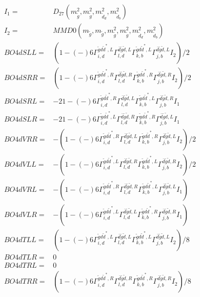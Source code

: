 \documentclass[A4,landscape]{article}
\begin{document}
\begin{align} 
I_1 = & D_{27}(m^2_{\tilde{g}}, m^2_{\tilde{g}}, m^2_{\tilde{d}_{{d}}}, m^2_{\tilde{d}_{{b}}}) \\ 
I_2 = & MMD0(m_{\tilde{g}}, m_{\tilde{g}}, m^2_{\tilde{g}}, m^2_{\tilde{g}}, m^2_{\tilde{d}_{{d}}}, m^2_{\tilde{d}_{{b}}}) \\ 
  BO4dSLL= & (  1
-(-)
  6 \Gamma^{\tilde{g} d \tilde{d}^*,L}_{i, d} \Gamma^{\bar{d}\tilde{g} \tilde{d} ,L}_{l, d} \Gamma^{\tilde{g} d \tilde{d}^*,L}_{k, b} \Gamma^{\bar{d}\tilde{g} \tilde{d} ,L}_{j, b} I_2)/2 \\ 
  BO4dSRR= & (  1
-(-)
  6 \Gamma^{\tilde{g} d \tilde{d}^*,R}_{i, d} \Gamma^{\bar{d}\tilde{g} \tilde{d} ,R}_{l, d} \Gamma^{\tilde{g} d \tilde{d}^*,R}_{k, b} \Gamma^{\bar{d}\tilde{g} \tilde{d} ,R}_{j, b} I_2)/2 \\ 
  BO4dSRL= & -2   1
-(-)
  6 \Gamma^{\tilde{g} d \tilde{d}^*,R}_{i, d} \Gamma^{\bar{d}\tilde{g} \tilde{d} ,L}_{l, d} \Gamma^{\tilde{g} d \tilde{d}^*,L}_{k, b} \Gamma^{\bar{d}\tilde{g} \tilde{d} ,R}_{j, b} I_1 \\ 
  BO4dSLR= & -2   1
-(-)
  6 \Gamma^{\tilde{g} d \tilde{d}^*,L}_{i, d} \Gamma^{\bar{d}\tilde{g} \tilde{d} ,R}_{l, d} \Gamma^{\tilde{g} d \tilde{d}^*,R}_{k, b} \Gamma^{\bar{d}\tilde{g} \tilde{d} ,L}_{j, b} I_1 \\ 
  BO4dVRR= & -(  1
-(-)
  6 \Gamma^{\tilde{g} d \tilde{d}^*,R}_{i, d} \Gamma^{\bar{d}\tilde{g} \tilde{d} ,L}_{l, d} \Gamma^{\tilde{g} d \tilde{d}^*,R}_{k, b} \Gamma^{\bar{d}\tilde{g} \tilde{d} ,L}_{j, b} I_2)/2 \\ 
  BO4dVLL= & -(  1
-(-)
  6 \Gamma^{\tilde{g} d \tilde{d}^*,L}_{i, d} \Gamma^{\bar{d}\tilde{g} \tilde{d} ,R}_{l, d} \Gamma^{\tilde{g} d \tilde{d}^*,L}_{k, b} \Gamma^{\bar{d}\tilde{g} \tilde{d} ,R}_{j, b} I_2)/2 \\ 
  BO4dVRL= & -(  1
-(-)
  6 \Gamma^{\tilde{g} d \tilde{d}^*,R}_{i, d} \Gamma^{\bar{d}\tilde{g} \tilde{d} ,R}_{l, d} \Gamma^{\tilde{g} d \tilde{d}^*,L}_{k, b} \Gamma^{\bar{d}\tilde{g} \tilde{d} ,L}_{j, b} I_1) \\ 
  BO4dVLR= & -(  1
-(-)
  6 \Gamma^{\tilde{g} d \tilde{d}^*,L}_{i, d} \Gamma^{\bar{d}\tilde{g} \tilde{d} ,L}_{l, d} \Gamma^{\tilde{g} d \tilde{d}^*,R}_{k, b} \Gamma^{\bar{d}\tilde{g} \tilde{d} ,R}_{j, b} I_1) \\ 
  BO4dTLL= & (  1
-(-)
  6 \Gamma^{\tilde{g} d \tilde{d}^*,L}_{i, d} \Gamma^{\bar{d}\tilde{g} \tilde{d} ,L}_{l, d} \Gamma^{\tilde{g} d \tilde{d}^*,L}_{k, b} \Gamma^{\bar{d}\tilde{g} \tilde{d} ,L}_{j, b} I_2)/8 \\ 
  BO4dTLR= & 0 \\ 
  BO4dTRL= & 0 \\ 
  BO4dTRR= & (  1
-(-)
  6 \Gamma^{\tilde{g} d \tilde{d}^*,R}_{i, d} \Gamma^{\bar{d}\tilde{g} \tilde{d} ,R}_{l, d} \Gamma^{\tilde{g} d \tilde{d}^*,R}_{k, b} \Gamma^{\bar{d}\tilde{g} \tilde{d} ,R}_{j, b} I_2)/8 \\ 
\end{align} 
\end{document}
